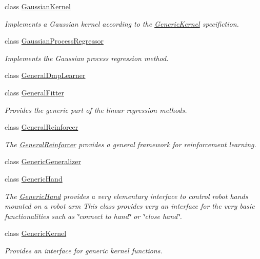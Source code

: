 \begin{DoxyCompactItemize}
\item 
class \hyperlink{classkukadu_1_1GaussianKernel}{Gaussian\+Kernel}
\begin{DoxyCompactList}\small\item\em Implements a Gaussian kernel according to the \hyperlink{classkukadu_1_1GenericKernel}{Generic\+Kernel} specifiction. \end{DoxyCompactList}\item 
class \hyperlink{classkukadu_1_1GaussianProcessRegressor}{Gaussian\+Process\+Regressor}
\begin{DoxyCompactList}\small\item\em Implements the Gaussian process regression method. \end{DoxyCompactList}\item 
class \hyperlink{classkukadu_1_1GeneralDmpLearner}{General\+Dmp\+Learner}
\item 
class \hyperlink{classkukadu_1_1GeneralFitter}{General\+Fitter}
\begin{DoxyCompactList}\small\item\em Provides the generic part of the linear regression methods. \end{DoxyCompactList}\item 
class \hyperlink{classkukadu_1_1GeneralReinforcer}{General\+Reinforcer}
\begin{DoxyCompactList}\small\item\em The \hyperlink{classkukadu_1_1GeneralReinforcer}{General\+Reinforcer} provides a general framework for reinforcement learning. \end{DoxyCompactList}\item 
class \hyperlink{classkukadu_1_1GenericGeneralizer}{Generic\+Generalizer}
\item 
class \hyperlink{classkukadu_1_1GenericHand}{Generic\+Hand}
\begin{DoxyCompactList}\small\item\em The \hyperlink{classkukadu_1_1GenericHand}{Generic\+Hand} provides a very elementary interface to control robot hands mounted on a robot arm This class provides very an interface for the very basic functionalities such as \char`\"{}connect to hand\char`\"{} or \char`\"{}close hand\char`\"{}. \end{DoxyCompactList}\item 
class \hyperlink{classkukadu_1_1GenericKernel}{Generic\+Kernel}
\begin{DoxyCompactList}\small\item\em Provides an interface for generic kernel functions. \end{DoxyCompactList}\item 

\end{DoxyCompactItemize}
